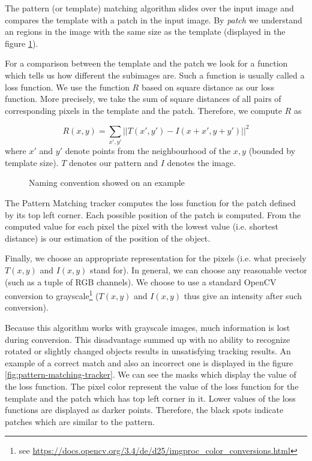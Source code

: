The pattern (or template) matching algorithm slides over the input image and
compares the template with a patch in the input image. By \emph{patch} we
understand an regions in the image with the same size as the template (displayed in the figure
\ref{fig:patternmatching-naming}).

For a comparison between the template and the patch we look for a function which
tells us how different the subimages are. Such a function is usually called
a loss function. We use the function $R$ based on square distance as our loss
function. More precisely, we take the sum of square distances of all pairs of
corresponding pixels in the template and the patch. Therefore, we compute $R$
as

$$
R(x, y) =
\sum_{x', y'} ||T(x', y') - I(x + x', y + y')||^2
$$
where $x'$ and $y'$ denote points from the neighbourhood of the $x, y$ (bounded by template size).
$T$ denotes our pattern and $I$ denotes the image.

\begin{figure}[h]
	\centering
	\def\svgwidth{0.9\linewidth}
	
	\caption{Naming convention showed on an example}
	\label{fig:patternmatching-naming}
\end{figure}

The Pattern Matching tracker computes the loss function for the patch defined
by its top left corner. Each possible position of the patch is computed.
From the computed value for each pixel the pixel with the lowest value
(i.e. shortest distance) is our estimation of the position of the object.

Finally, we choose an appropriate representation for the pixels (i.e. what
precisely $T(x, y)$ and $I(x, y)$ stand for). In general, we can choose any
reasonable vector (such as a tuple of RGB channels). We choose to use a
standard OpenCV conversion to grayscale\footnote{see \url{https://docs.opencv.org/3.4/de/d25/imgproc\_color\_conversions.html}}
($T(x, y)$ and $I(x, y)$ thus give an intensity after such conversion).

Because this algorithm works with grayscale images, much information is
lost during conversion. This disadvantage summed up with no ability to
recognize rotated or slightly changed objects results in unsatisfying tracking
results. An example of a correct match and also an incorrect one is displayed in the
figure \ref{fig:pattern-matching-tracker}. We can see the masks which display
the value of the loss function. The pixel color represent the value of the loss
function for the template and the patch which has top left corner in it. Lower
values of the loss functions are displayed as darker points. Therefore, the
black spots indicate patches which are similar to the pattern.

